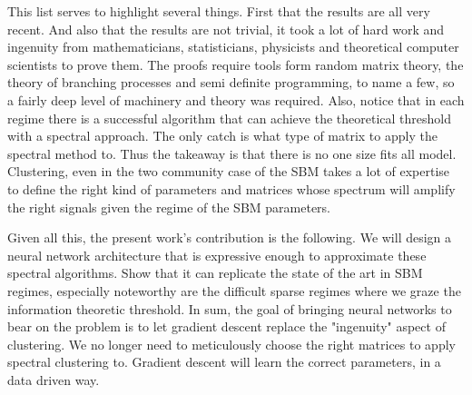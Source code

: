 This list serves to highlight several things.  First that the results are all very recent. And also that the results are not trivial, it took a lot of hard work and ingenuity from mathematicians, statisticians, physicists and theoretical computer scientists to prove them.  The proofs require tools form random matrix theory, the theory of branching processes and semi definite programming, to name a few, so a fairly deep level of machinery and theory was required. Also, notice that in each regime there is a successful algorithm that can achieve the theoretical threshold with a spectral approach.  The only catch is what type of matrix to apply the spectral method to.  Thus the takeaway is that there is no one size fits all model. Clustering, even in the two community case of the SBM takes a lot of expertise to define the right kind of parameters and matrices whose spectrum will amplify the right signals given the regime of the SBM parameters.  

Given all this, the present work's contribution is the following.  We will design a neural network architecture that is expressive enough to approximate these spectral algorithms.  Show that it can replicate the state of the art in SBM regimes, especially noteworthy are the difficult sparse regimes where we graze the information theoretic threshold. %
In sum, the goal of bringing neural networks to bear on the problem is to let gradient descent replace the "ingenuity" aspect of clustering.  We no longer need to meticulously choose the right matrices to apply spectral clustering to.  Gradient descent will learn the correct parameters, in a data driven way. 
